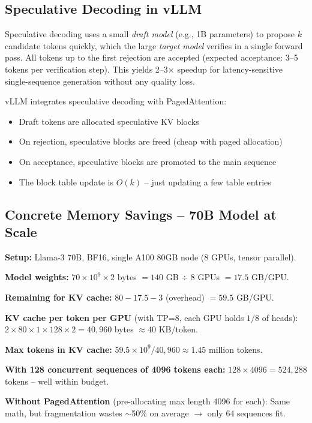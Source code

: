 \subsection{Speculative Decoding in vLLM}
\label{speculative-decoding-integration}

Speculative decoding uses a small \emph{draft model} (e.g., 1B parameters) to propose $k$ candidate tokens quickly, which the large \emph{target model} verifies in a single forward pass. All tokens up to the first rejection are accepted (expected acceptance: 3--5 tokens per verification step). This yields 2--3$\times$ speedup for latency-sensitive single-sequence generation without any quality loss.

vLLM integrates speculative decoding with PagedAttention:

\begin{itemize}
  \item Draft tokens are allocated speculative KV blocks
  \item On rejection, speculative blocks are freed (cheap with paged allocation)
  \item On acceptance, speculative blocks are promoted to the main sequence
  \item The block table update is $O(k)$ -- just updating a few table entries
\end{itemize}

\subsection{Concrete Memory Savings -- 70B Model at Scale}
\label{concrete-memory-savings-70b-model-at-scale}

\begin{examplebox}
\textbf{Setup:} Llama-3 70B, BF16, single A100 80GB node (8 GPUs, tensor parallel).

\textbf{Model weights:} $70 \times 10^9 \times 2$ bytes $= 140$ GB $\div$ 8 GPUs $= 17.5$ GB/GPU.

\textbf{Remaining for KV cache:} $80 - 17.5 - 3$ (overhead) $= 59.5$ GB/GPU.

\textbf{KV cache per token per GPU} (with TP=8, each GPU holds $1/8$ of heads): $2 \times 80 \times 1 \times 128 \times 2 = 40{,}960$ bytes $\approx 40$ KB/token.

\textbf{Max tokens in KV cache:} $59.5 \times 10^9 / 40{,}960 \approx 1.45$ million tokens.

\textbf{With 128 concurrent sequences of 4096 tokens each:} $128 \times 4096 = 524{,}288$ tokens -- well within budget.

\textbf{Without PagedAttention} (pre-allocating max length 4096 for each): Same math, but fragmentation wastes $\sim$50\% on average $\to$ only 64 sequences fit.
\end{examplebox}

